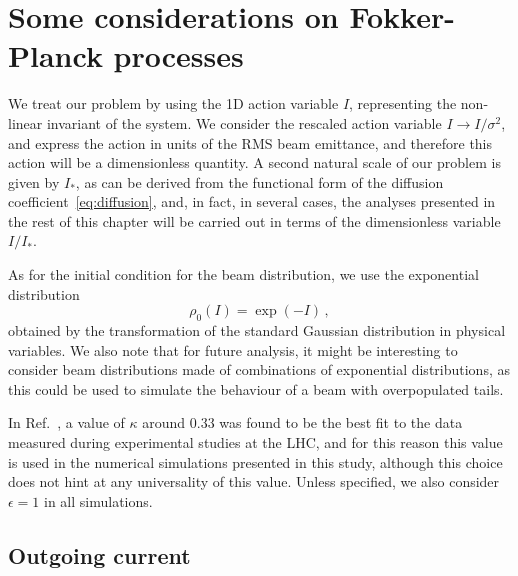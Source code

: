 {%
\section{Some considerations on Fokker-Planck processes}\label{sec:some_considerations}

We treat our problem by using the 1D action variable $I$, representing the non-linear invariant of the system. We consider the rescaled action variable $I \to I/\sigma^2$, and express the action in units of {the RMS} beam emittance, and therefore this action will be a dimensionless quantity. {A second natural scale of our problem is given by $I_\ast$, as can be derived from the functional form of the diffusion coefficient~\eqref{eq:diffusion}, and, in fact, in several cases, the analyses presented in the rest of this chapter will be carried out in terms of the dimensionless variable $I/I_\ast$.}

As for the initial condition for the beam distribution, we use the exponential distribution
\begin{equation}
    \rho_0(I) = \exp(-I) \, , 
    \label{eq:initial_distribution}
\end{equation}
obtained by the transformation of the standard Gaussian distribution in physical variables. We also note that for future analysis, it might be interesting to consider beam distributions made of combinations of exponential distributions, as this could be used to simulate the behaviour of a beam with overpopulated tails.

In Ref.~\cite{bazzani2020diffusion}, a value of $\kappa$ around $0.33$ was found to be the best fit to the data measured during experimental studies at the LHC, and for this reason this value is used in the numerical simulations presented in this study, {although this choice does not hint at any universality of this value.} Unless specified, we also consider $\epsilon=1$ in all simulations.

\subsection{Outgoing current}\label{subsec:outgoing_current}


}

